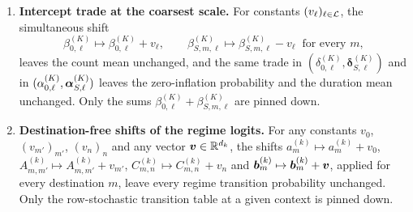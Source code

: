 \begin{proposition}
\begin{enumerate}
\item \textbf{Intercept trade at the coarsest scale.} For constants
$(v_\ell)_{\ell \in {\mathcal{L}}}$, the simultaneous shift
\[
\beta_{0,\ell}^{(K)} \mapsto \beta_{0,\ell}^{(K)} + v_\ell,
\qquad
\beta_{S,m,\ell}^{(K)} \mapsto \beta_{S,m,\ell}^{(K)} - v_\ell
\;\;\text{for every } m,
\]
leaves the count mean unchanged, and the same trade in
$(\delta_{0,\ell}^{(K)}, \boldsymbol{\delta}_{S,\ell}^{(K)})$ and in
$(\alpha_{0,\ell}^{(K)}, {\boldsymbol{\alpha}}_{S,\ell}^{(K)})$ leaves the zero-inflation
probability and the duration mean unchanged. Only the sums
$\beta_{0,\ell}^{(K)} + \beta_{S,m,\ell}^{(K)}$ are pinned down.

\item \textbf{Destination-free shifts of the regime logits.} For any constants
$v_0$, $(v_{m'})_{m'}$, $(v_n)_n$ and any vector ${\bm{v}} \in {\mathbb{R}}^{d_k}$, the
shifts
$a_m^{(k)} \mapsto a_m^{(k)} + v_0$,
$A_{m,m'}^{(k)} \mapsto A_{m,m'}^{(k)} + v_{m'}$,
$C_{m,n}^{(k)} \mapsto C_{m,n}^{(k)} + v_n$
and
${\bm{b}}_m^{(k)} \mapsto {\bm{b}}_m^{(k)} + {\bm{v}}$,
applied for every destination $m$, leave every regime transition probability
unchanged. Only the row-stochastic transition table at a given context is
pinned down.
\end{enumerate}
\end{proposition}

